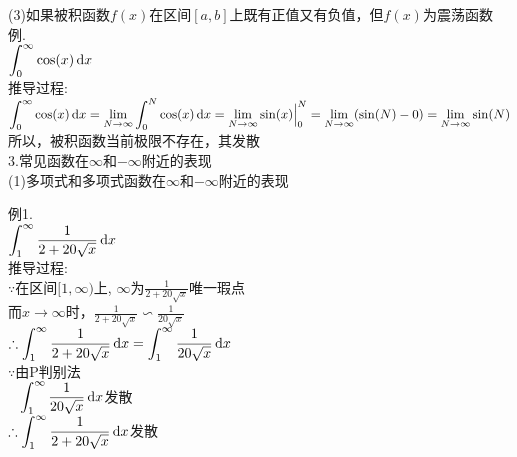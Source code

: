 (3)如果被积函数$f(x)$在区间$[a,b]$上既有正值又有负值，但$f(x)$为震荡函数\\
例.\\
$\displaystyle\int_0^{\infty}\cos(x)\mathop{}\!\mathrm{d} x$\\
推导过程:\\
$\displaystyle\int_0^{\infty}\cos(x)\mathop{}\!\mathrm{d} x=\lim_{N\to\infty}\int_0^N\cos(x)\mathop{}\!\mathrm{d} x=\lim_{N\to\infty}\sin(x)\Big|_0^N=\lim_{N\to\infty}(\sin(N)-0)=\lim_{N\to\infty}\sin(N)$\\
所以，被积函数当前极限不存在，其发散\\[2ex]

3.常见函数在$\infty$和$-\infty$附近的表现\\
(1)多项式和多项式函数在$\infty$和$-\infty$附近的表现
{\par\centering
{}
\par}
例1.\\
$\displaystyle\int_1^{\infty}\frac{1}{2+20\sqrt{x}}\mathop{}\!\mathrm{d} x$\\
推导过程:\\
$\because$在区间$[1,\infty)$上, $\infty$为$\displaystyle\frac{1}{2+20\sqrt{x}}$唯一瑕点\\
\phantom{$because$}而$x\to\infty$时，$\displaystyle\frac{1}{2+20\sqrt{x}}\backsim\frac{1}{20\sqrt{x}}$\\
$\displaystyle\therefore\int_1^{\infty}\frac{1}{2+20\sqrt{x}}\mathop{}\!\mathrm{d} x=\int_1^{\infty}\frac{1}{20\sqrt{x}}\mathop{}\!\mathrm{d} x$\\
$\because$由P判别法\\
$\displaystyle\phantom{\because}\int_1^{\infty}\frac{1}{20\sqrt{x}}\mathop{}\!\mathrm{d} x$发散\\
$\displaystyle\therefore\int_1^{\infty}\frac{1}{2+20\sqrt{x}}\mathop{}\!\mathrm{d} x$发散\\[1ex]

